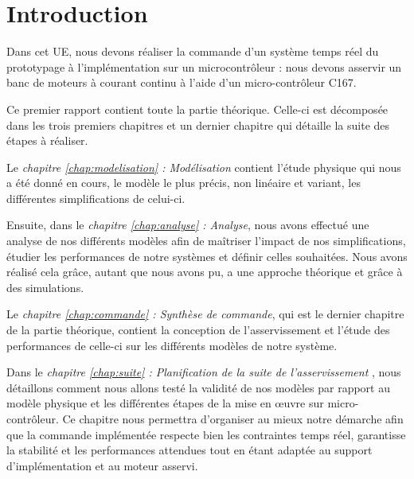 \chapter*{Introduction}
\label{chap:Intro}

Dans cet UE, nous devons réaliser la commande d’un système temps réel du prototypage à l'implémentation sur un microcontrôleur : nous devons asservir un banc de moteurs à courant continu à l'aide d'un micro-contrôleur C167. 

Ce premier rapport contient toute la partie théorique. Celle-ci est décomposée dans les trois premiers chapitres et un dernier chapitre qui détaille la suite des étapes à réaliser.

Le \emph{chapitre \ref{chap:modelisation} : Modélisation} contient l'étude physique qui nous a été donné en cours, le modèle le plus précis, non linéaire et variant, les différentes simplifications de celui-ci. 

Ensuite, dans le \emph{chapitre \ref{chap:analyse} : Analyse}, nous avons effectué une analyse de nos différents modèles afin de maîtriser l’impact de nos simplifications, étudier les performances de notre systèmes et définir celles souhaitées. Nous avons réalisé cela grâce, autant que nous avons pu, a une approche théorique et grâce à des simulations.

Le \emph{chapitre \ref{chap:commande} : Synthèse de commande}, qui est le dernier chapitre de la partie théorique, contient la conception de l'asservissement et l'étude des performances de celle-ci sur les différents modèles de notre système.
 
Dans le \emph{chapitre \ref{chap:suite} : Planification de la suite de l'asservissement }, nous détaillons comment nous allons testé la validité de nos modèles par rapport au modèle physique et les différentes étapes de la mise en \oe uvre sur micro-contrôleur. Ce chapitre nous permettra d'organiser au mieux notre démarche afin que la commande implémentée respecte bien les contraintes temps réel, garantisse la stabilité et les performances attendues tout en étant adaptée au support d'implémentation et au moteur asservi.

